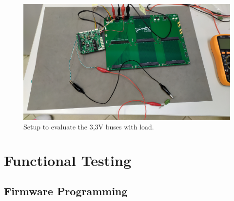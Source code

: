 \newpage

\begin{figure}[!ht]
    \begin{center}
        \includegraphics[width=\columnwidth]{figures/v02/3v3_setup_test.jpg}
        \caption{Setup to evaluate the 3,3V buses with load.}
        \label{fig:3v3_setup_test}
    \end{center}
\end{figure}

\section{Functional Testing}

\subsection{Firmware Programming}

